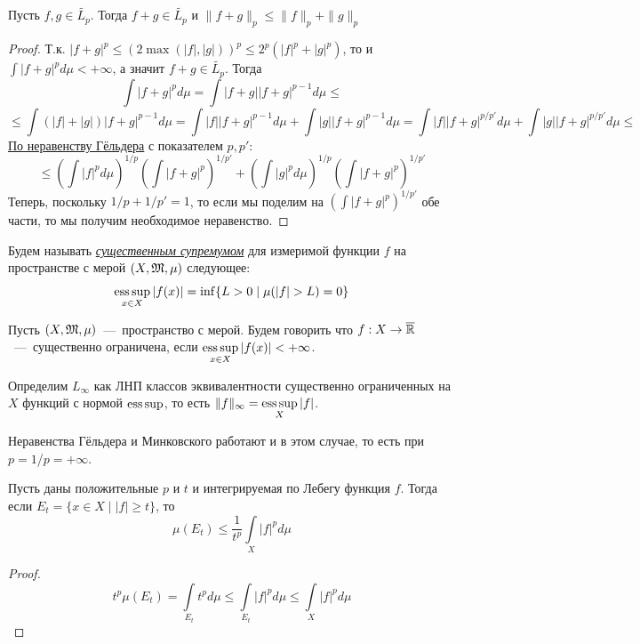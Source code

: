 \begin{lemma}
    Пусть $f, g \in \widetilde{L_p}$. Тогда $f + g \in \widetilde{L_p}$ и $\|f + g\|_p \leq \|f\|_p + \|g\|_p$
\end{lemma}
\begin{proof}
    Т.к. $|f + g|^p \leq (2\max (|f|, |g|))^p \leq 2^p(|f|^p + |g|^p)$, то и $\int |f + g|^p d\mu < +\infty$, а значит $f + g \in \widetilde{L_p}$. Тогда \[\int |f + g|^p d\mu = \int |f + g||f + g|^{p - 1}d\mu \leq \]\[  \leq \int (|f| + |g|)|f + g|^{p - 1}d\mu = \int |f||f + g|^{p - 1}d\mu + \int |g||f + g|^{p - 1}d\mu = \int |f||f + g|^{p/p'}d\mu + \int |g||f + g|^{p/p'} d\mu \leq \]  \hyperlink{gyolder}{По неравенству Гёльдера} с показателем $p, p':$ \[
    \leq \left(\int |f|^pd\mu \right)^{1/p} \left(\int |f + g|^p \right)^{1/p'} + \left(\int |g|^pd\mu \right)^{1/p} \left(\int |f + g|^p \right)^{1/p'}
    \]
    Теперь, поскольку $1/p + 1/p' = 1$, то если мы поделим на $(\int |f + g|^p)^{1/p'}$ обе части, то мы получим необходимое неравенство.
\end{proof}

\begin{definition}
    Будем называть \textit{\underline{существенным супремумом}} для измеримой функции $f$ на пространстве с мерой $(X, \mathfrak{M}, \mu)$ следующее: \[\operatorname*{ess\,sup}\limits_{x \in X}|f(x)| = \inf\{L > 0 \mid \mu(|f| > L) = 0\}\]
\end{definition}
\begin{definition}
    Пусть $(X, \mathfrak{M}, \mu)$~---~пространство с мерой. Будем говорить что $f: X \rightarrow \overline{\mathbb{R}}$~---~существенно ограничена, если $\operatorname*{ess\,sup}\limits_{x \in X} |f(x)| < +\infty$.
\end{definition}
\begin{definition}
    Определим $L_\infty$ как ЛНП классов эквивалентности существенно ограниченных на $X$ функций с нормой $\operatorname*{ess\,sup}$, то есть $\|f\|_\infty = \operatorname*{ess\,sup}\limits_X |f|$.
\end{definition}
\begin{note}
    Неравенства Гёльдера и Минковского работают и в этом случае, то есть при $p = 1$/$p = +\infty$.
\end{note}

\begin{theorem}
    Пусть даны положительные $p$ и $t$ и интегрируемая по Лебегу функция $f$. Тогда если $E_t = \{x \in X \mid |f| \geq t\}$, то \[\mu(E_t) \leq \frac{1}{t^p}\int\limits_X |f|^pd\mu\]
\end{theorem}
\begin{proof}
    \[t^p\mu(E_t) = \int\limits_{E_t} t^pd\mu \leq \int\limits_{E_t} |f|^pd\mu \leq \int\limits_{X}|f|^pd\mu\]
\end{proof}